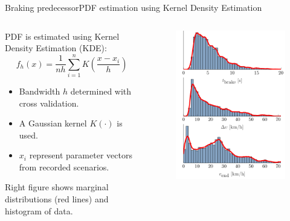 \documentclass[aspectratio=\AspectR,10pt,compress,t]{beamer} %
\begin{document}
\begin{frame}{Braking predecessor}{PDF estimation using Kernel Density Estimation}
	\begin{columns}
		\begin{column}{0.6\textwidth}
			PDF is estimated using Kernel Density Estimation (KDE):
			\begin{equation}
				f_h(x) = \frac{1}{nh} \sum_{i=1}^n K\left( \frac{x-x_i}{h} \right)
			\end{equation}
			\begin{itemize}
				\item Bandwidth $h$ determined with cross validation.
				\item A Gaussian kernel $K(\cdot)$ is used.
				\item $x_i$ represent parameter vectors from recorded scenarios.
			\end{itemize}
			Right figure shows marginal distributions (red lines) and histogram of data.
		\end{column}
		\begin{column}{0.3\textwidth}
			\begin{figure}
				\centering
				\vspace{-1em}
				\includegraphics[width=\linewidth]{KDE_regular.pdf}
			\end{figure}
		\end{column}
	\end{columns}
\end{frame}
\end{document}
